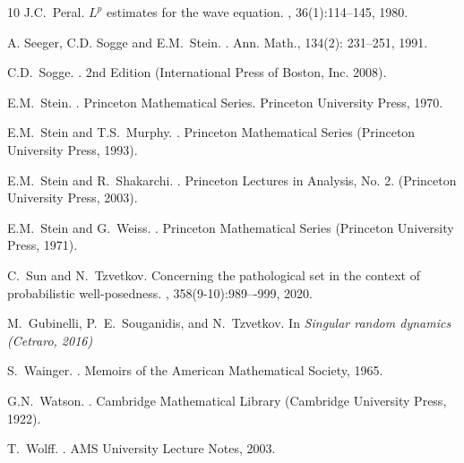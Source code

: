 \documentclass[a4paper, reqno, 11pt]{amsart}
\theoremstyle{definition}
\begin{document}
\begin{thebibliography}{10}
		J.C.~Peral.
		\newblock $L^p$ estimates for the wave equation.
		, 36(1):114--145, 1980.
	
		
		A. Seeger, C.D. Sogge and E.M.~Stein.
		.
		\newblock Ann. Math., 134(2): 231--251, 1991.
	

		C.D.~Sogge.
		.
		\newblock 2nd Edition (International Press of Boston, Inc. 2008).	
		
		E.M.~Stein.
		.
		\newblock Princeton Mathematical Series. Princeton University Press, 1970.
		
		E.M.~Stein and T.S.~Murphy.
		.
		\newblock Princeton Mathematical Series (Princeton University Press, 1993).
		
		E.M.~Stein and R.~Shakarchi.
		.
		\newblock Princeton Lectures in Analysis, No. 2. (Princeton University Press, 2003).
		
		E.M.~Stein and G.~Weiss.
		.
		\newblock Princeton Mathematical Series (Princeton University Press, 1971).
		
		
		C.~Sun and N.~Tzvetkov.
		\newblock Concerning the pathological set in the context of probabilistic well-posedness.
		, 358(9-10):989–-999, 2020.	
		
		M.~Gubinelli, P.~E.~Souganidis, and N.~Tzvetkov.
		\newblock In {\em Singular random dynamics ({C}etraro, 2016)}
		
		
		S.~Wainger.
		.
		\newblock Memoirs of the American Mathematical Society, 1965.	
		
		G.N.~Watson.
		.
		\newblock Cambridge Mathematical Library (Cambridge University Press, 1922).
		
		T.~Wolff.
		.
		\newblock AMS University Lecture Notes, 2003.
		
	\end{thebibliography}
	
\end{document}
